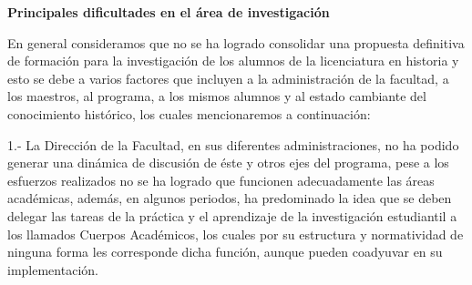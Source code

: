 \medskip
{\bfseries Principales dificultades en el área de investigación}
\enlargethispage{1\baselineskip}

En general consideramos que no se ha logrado consolidar una propuesta 
definitiva de formación para la investigación de los alumnos de la 
licenciatura en historia y esto se debe a varios factores que incluyen 
a la administración de la facultad, a los maestros, al programa, a los 
mismos alumnos y al estado cambiante del conocimiento histórico, los 
cuales mencionaremos a continuación:

\begin{Obs}
\item[1.-] La Dirección de la Facultad, en sus diferentes administraciones, no 
ha podido generar una dinámica de discusión de éste y otros ejes del 
programa, pese a los esfuerzos realizados no se ha logrado que 
funcionen adecuadamente las áreas académicas, además, en algunos 
periodos, ha predominado la idea que se deben delegar las tareas de la 
práctica y el aprendizaje de la investigación estudiantil a los 
llamados Cuerpos Académicos, los cuales por su estructura y 
normatividad de ninguna forma les corresponde dicha función, aunque 
pueden coadyuvar en su implementación.


\end{Obs}

